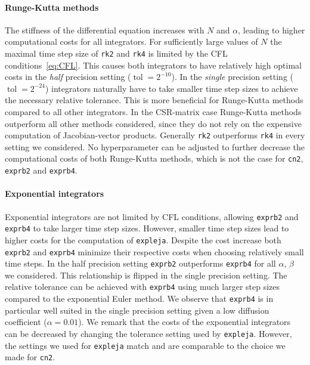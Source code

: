 \documentclass{scrartcl}
\begin{document}
	\paragraph{Runge-Kutta methods}
	The stiffness of the differential equation increases with $N$ and $\alpha$, leading to higher computational costs for all integrators. For sufficiently large values of $N$ the maximal time step size of \texttt{rk2} and \texttt{rk4} is limited by the CFL conditions~\ref{eq:CFL}. This causes both integrators to have relatively high optimal costs in the \textit{half} precision setting ($\operatorname{tol}=2^{-10}$). In the \textit{single} precision setting ($\operatorname{tol}=2^{-24}$) integrators naturally have to take smaller time step sizes to achieve the necessary relative tolerance. This is more beneficial for Runge-Kutta methods compared to all other integrators. In the CSR-matrix case Runge-Kutta methods outperform all other methods considered, since they do not rely on the expensive computation of Jacobian-vector products. Generally \texttt{rk2} outperforms \texttt{rk4} in every setting we considered. No hyperparameter can be adjusted to further decrease the computational costs of both Runge-Kutta methods, which is not the case for \texttt{cn2}, \texttt{exprb2} and \texttt{exprb4}.
	
	\paragraph{Exponential integrators}
	Exponential integrators are not limited by CFL conditions, allowing \texttt{exprb2} and \texttt{exprb4} to take larger time step sizes. However, smaller time step sizes lead to higher costs for the computation of \texttt{expleja}. Despite the cost increase both \texttt{exprb2} and \texttt{exprb4} minimize their respective costs when choosing relatively small time steps. In the half precision setting \texttt{exprb2} outperforms \texttt{exprb4} for all $\alpha$, $\beta$ we considered. This relationship is flipped in the single precision setting. The relative tolerance can be achieved with \texttt{exprb4} using much larger step sizes compared to the exponential Euler method. We observe that \texttt{exprb4} is in particular well suited in the single precision setting given a low diffusion coefficient ($\alpha = 0.01$). We remark that the costs of the exponential integrators can be decreased by changing the tolerance setting used by \texttt{expleja}. However, the settings we used for \texttt{expleja} match \cite{lejarev} and are comparable to the choice we made for \texttt{cn2}. 
	
\end{document}
